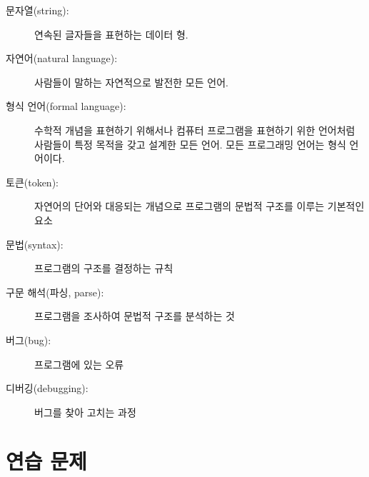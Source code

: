 \documentclass[10pt]{book}
\begin{document}
\begin{description}
\item[문자열(string):] 연속된 글자들을 표현하는 데이터 형.

\item[자연어(natural language):]  사람들이 말하는 자연적으로 발전한 모든 언어.

\item[형식 언어(formal language):] 수학적 개념을 표현하기 위해서나
  컴퓨터 프로그램을 표현하기 위한 언어처럼 사람들이 특정 목적을 갖고
  설계한 모든 언어. 모든 프로그래밍 언어는 형식 언어이다.

\item[토큰(token):] 자연어의 단어와 대응되는 개념으로 프로그램의 문법적
  구조를 이루는 기본적인 요소

\item[문법(syntax):] 프로그램의 구조를 결정하는 규칙

\item[구문 해석(파싱, parse):] 프로그램을 조사하여 문법적 구조를 분석하는 것

\item[버그(bug):] 프로그램에 있는 오류

\item[디버깅(debugging):] 버그를 찾아 고치는 과정

\end{description}


\section{연습 문제}
\end{document}
